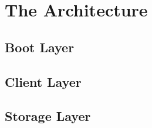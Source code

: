 \section{The Architecture} %
\label{sec:icbd_architecture}


\subsection{Boot Layer}
\label{sub:icbd_architecture_boot}

\subsection{Client Layer}
\label{sub:icbd_architecture_client}

\subsection{Storage Layer}
\label{sub:icbd_architecture_storage}





 
